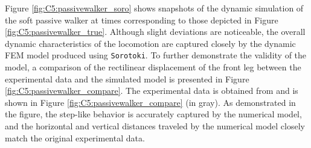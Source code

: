 Figure \ref{fig:C5:passivewalker_soro} shows snapshots of the dynamic simulation of the soft passive walker at times corresponding to those depicted in Figure \ref{fig:C5:passivewalker_true}. Although slight deviations are noticeable, the overall dynamic characteristics of the locomotion are captured closely by the dynamic FEM model produced using \texttt{Sorotoki}. To further demonstrate the validity of the model, a comparison of the rectilinear displacement of the front leg between the experimental data and the simulated model is presented in Figure \ref{fig:C5:passivewalker_compare}. The experimental data is obtained from \cite{Suzumori2008Sep} and is shown in Figure \ref{fig:C5:passivewalker_compare} (in gray). As demonstrated in the figure, the step-like behavior is accurately captured by the numerical model, and the horizontal and vertical distances traveled by the numerical model closely match the original experimental data.

